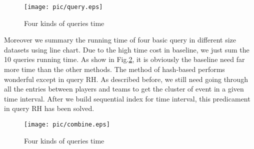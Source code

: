 \begin{figure}[H]
	\centering
	\texttt{[image: pic/query.eps]}\\
	\caption{Four kinds of queries time}
	\label{query}
\end{figure}
Moreover we summary the running time of four basic query in different size datasets using line chart. Due to the high time cost 
in baseline, we just sum the 10 queries running time. As show in Fig.\ref{combine}, it is obviously the baseline need far more time
than the other methods. The method of hash-based performs wonderful except in query RH. As described before,  we still need going 
through all the entries between players and teams to get the cluster of event in a given time interval. After we build sequential
index for time interval, this predicament in query RH has been solved.


\begin{figure}[H]
	\centering
	\texttt{[image: pic/combine.eps]}\\
	\caption{Four kinds of queries time}
	\label{combine}
\end{figure}

